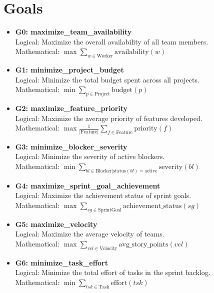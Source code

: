 \documentclass[11pt]{article}
\begin{document}
\section{Goals}
\begin{itemize}
    \item \textbf{G0: maximize\_team\_availability} \\
    Logical: Maximize the overall availability of all team members. \\
    Mathematical: $\max \sum_{w \in \text{Worker}} \text{availability}(w)$
    
    \item \textbf{G1: minimize\_project\_budget} \\
    Logical: Minimize the total budget spent across all projects. \\
    Mathematical: $\min \sum_{p \in \text{Project}} \text{budget}(p)$
    
    \item \textbf{G2: maximize\_feature\_priority} \\
    Logical: Maximize the average priority of features developed. \\
    Mathematical: $\max \frac{1}{|\text{Feature}|} \sum_{f \in \text{Feature}} \text{priority}(f)$
    
    \item \textbf{G3: minimize\_blocker\_severity} \\
    Logical: Minimize the severity of active blockers. \\
    Mathematical: $\min \sum_{bl \in \text{Blocker} | \text{status}(bl) = \text{active}} \text{severity}(bl)$
    
    \item \textbf{G4: maximize\_sprint\_goal\_achievement} \\
    Logical: Maximize the achievement status of sprint goals. \\
    Mathematical: $\max \sum_{sg \in \text{SprintGoal}} \text{achievement\_status}(sg)$
    
    \item \textbf{G5: maximize\_velocity} \\
    Logical: Maximize the average velocity of teams. \\
    Mathematical: $\max \sum_{vel \in \text{Velocity}} \text{avg\_story\_points}(vel)$
    
    \item \textbf{G6: minimize\_task\_effort} \\
    Logical: Minimize the total effort of tasks in the sprint backlog. \\
    Mathematical: $\min \sum_{tsk \in \text{Task}} \text{effort}(tsk)$
    

\end{itemize}
\end{document}
